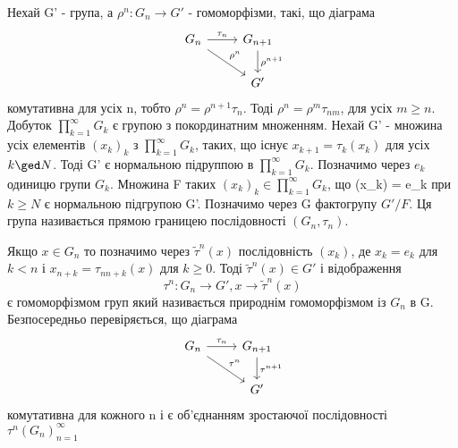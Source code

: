Нехай G' - група, а $\rho^n: G_n \rightarrow G'$ - гомоморфізми, такі, що діаграма
\begin{equation*}
    \begin{tikzcd}
        G_n \arrow[rd, "\rho^n"] \arrow[r, "\tau_n"] & G_{n+1} \arrow[d, "\rho^{n+1}"] \\
        & G'
    \end{tikzcd}
\end{equation*}
комутативна для усіх n, тобто $\rho^n = \rho^{n+1}\tau_n$.
Тоді $\rho^n = \rho^{m}\tau_{nm}$, для усіх $m \geq n$.
Добуток $\prod_{k=1}^{\infty} G_k$ є групою з покординатним множенням.
Нехай G' - множина усіх елементів $(x_k)_k$ з $\prod_{k=1}^{\infty} G_k$,
таких, що існує $x_{k+1} = \tau_k(x_k)$ для усіх $k \ged N$.
Тоді G' є нормальною підруппою в $\prod_{k=1}^{\infty} G_k$.
Позначимо через $e_k$ одиницю групи $G_k$.
Множина F таких $(x_k)_k \in \prod_{k=1}^{\infty} G_k$, що (x_k) = e_k при $k \geq N$ є нормальною підгрупою G'.
Позначимо через G фактогрупу $G' / F$.
Ця група називається прямою границею послідовності $(G_n, \tau_n)$.

Якщо $x \in G_n$ то позначимо через $\widetilde{\tau}^n(x)$ послідовність $(x_k)$, де $x_k = e_k$ для
$k < n$ і $x_{n+k} = \tau_{n n+k}(x)$ для $k \geq 0$.
Тоді $\widetilde{\tau}^n(x) \in G'$ і відображення
\begin{equation*}
    \tau^n: G_n \rightarrow G', x \rightarrow \widetilde{\tau}^n(x)
\end{equation*}
є гомоморфізмом груп який називається природнім гомоморфізмом із $G_n$ в G.
Безпосередньо перевіряється, що діаграма
\begin{equation*}
    \begin{tikzcd}
        G_n \arrow[rd, "\tau^n"] \arrow[r, "\tau_n"] & G_{n+1} \arrow[d, "\tau^{n+1}"] \\
        & G'
    \end{tikzcd}
\end{equation*}
комутативна для кожного n і є об'єднанням зростаючої послідовності $\tau^n(G_n)_{n=1}^{\infty}$

